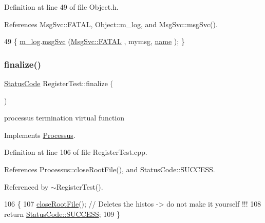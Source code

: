 Definition at line 49 of file Object.\+h.



References Msg\+Svc\+::\+F\+A\+T\+AL, Object\+::m\+\_\+log, and Msg\+Svc\+::msg\+Svc().


\begin{DoxyCode}
49 \{ \hyperlink{classObject_a0d269813dd7ac1f24bc143031e2963f2}{m\_log}.\hyperlink{classMsgSvc_ad25f18047920cc59a314e5098259711c}{msgSvc} (\hyperlink{classMsgSvc_ae671eb7301996cd049d2da8a65925926a59c73cb29edfc9cdf35845e2b1301363}{MsgSvc::FATAL}   , mymsg, \hyperlink{classObject_a300f4c05dd468c7bb8b3c968868443c1}{name} ); \}
\end{DoxyCode}
\mbox{\label{classRegisterTest_a6d37b30d3e663c99f7deef01310bea76}} 
\subsubsection{\texorpdfstring{finalize()}{finalize()}}
{\footnotesize\ttfamily \hyperlink{classStatusCode}{Status\+Code} Register\+Test\+::finalize (\begin{DoxyParamCaption}{ }\end{DoxyParamCaption})\hspace{0.3cm}{\ttfamily [virtual]}}

processus termination virtual function 

Implements \hyperlink{classProcessus_aba93d691f031bdb18ae4b8afb1b2e856}{Processus}.



Definition at line 106 of file Register\+Test.\+cpp.



References Processus\+::close\+Root\+File(), and Status\+Code\+::\+S\+U\+C\+C\+E\+SS.



Referenced by $\sim$\+Register\+Test().


\begin{DoxyCode}
106                                     \{
107   \hyperlink{classProcessus_a2f3c41e99da4c738ea3d8f7b0d20a665}{closeRootFile}(); \textcolor{comment}{// Deletes the histos -> do not make it yourself !!!}
108   \textcolor{keywordflow}{return} \hyperlink{classStatusCode_a6f565cbeadc76d14c72f047e5e85eb4badd0da38d3ba0d922efd1f4619bc37ad8}{StatusCode::SUCCESS};
109 \}
\end{DoxyCode}
\mbox{\label{classProcessus_a409227db936baff03c0462c1bcfe8069}} 
